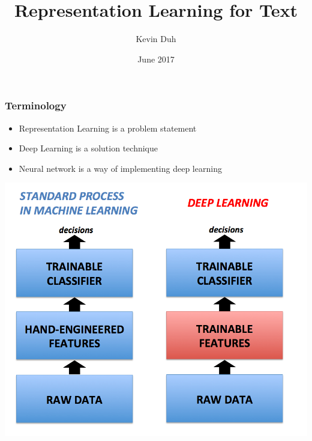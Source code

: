 \documentclass{beamer}
\title{Representation Learning for Text}
\author{Kevin Duh}
\institute{Johns Hopkins University}
\date{June 2017}
\newcommand{\bi}{\begin{itemize}}
\newcommand{\ei}{\end{itemize}}
\begin{document}
\begin{frame}
\titlepage
\end{frame}

\begin{frame}
\frametitle{Terminology}
\bi 
\item Representation Learning is a problem statement
\item Deep Learning is a solution technique
\item Neural network is a way of implementing deep learning
\ei
\centerline{\includegraphics[scale=0.25]{figs/deep_vs_conventional_learning}}
\end{frame}
\end{document}
